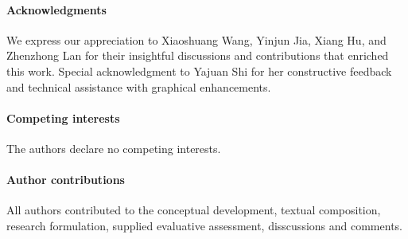 \paragraph{Acknowledgments}

We express our appreciation to Xiaoshuang Wang, Yinjun Jia, Xiang Hu, and Zhenzhong Lan for their insightful discussions and contributions that enriched this work. Special acknowledgment to Yajuan Shi for her constructive feedback and technical assistance with graphical enhancements.

\paragraph{Competing interests}

The authors declare no competing interests.

\paragraph{Author contributions}
All authors contributed to the conceptual development, textual composition, research formulation, supplied evaluative assessment, disscussions and comments.

